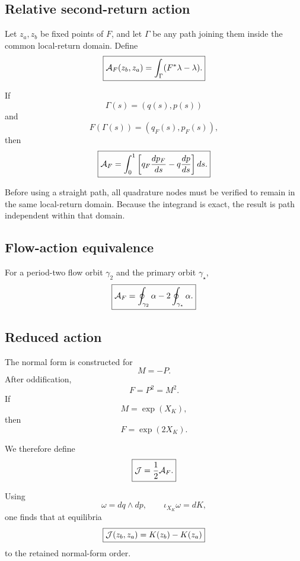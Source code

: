 \subsection{Relative second-return action}

Let \(z_a,z_b\) be fixed points of \(F\), and let \(\Gamma\) be any path joining them inside the common local-return domain. Define
\[
\boxed{
\mathcal{A}_F(z_b,z_a)
=
\int_\Gamma(F^*\lambda-\lambda).
}
\]

If
\[
\Gamma(s)=(q(s),p(s))
\]
and
\[
F(\Gamma(s))=(q_F(s),p_F(s)),
\]
then
\[
\boxed{
\mathcal{A}_F
=
\int_0^1
\left[
q_F\frac{dp_F}{ds}
-
q\frac{dp}{ds}
\right]ds.
}
\]

Before using a straight path, all quadrature nodes must be verified to remain in the same local-return domain. Because the integrand is exact, the result is path independent within that domain.

\subsection{Flow-action equivalence}

For a period-two flow orbit \(\gamma_2\) and the primary orbit \(\gamma_\star\),
\[
\boxed{
\mathcal{A}_F
=
\oint_{\gamma_2}\alpha
-
2\oint_{\gamma_\star}\alpha.
}
\]

\subsection{Reduced action}

The normal form is constructed for
\[
M=-P.
\]
After oddification,
\[
F=P^2=M^2.
\]
If
\[
M=\exp(X_K),
\]
then
\[
F=\exp(2X_K).
\]

We therefore define
\[
\boxed{
\mathcal{J}=\frac12\mathcal{A}_F.
}
\]

Using
\[
\omega=dq\wedge dp,\qquad
\iota_{X_K}\omega=dK,
\]
one finds that at equilibria
\[
\boxed{
\mathcal{J}(z_b,z_a)=K(z_b)-K(z_a)
}
\]
to the retained normal-form order.

